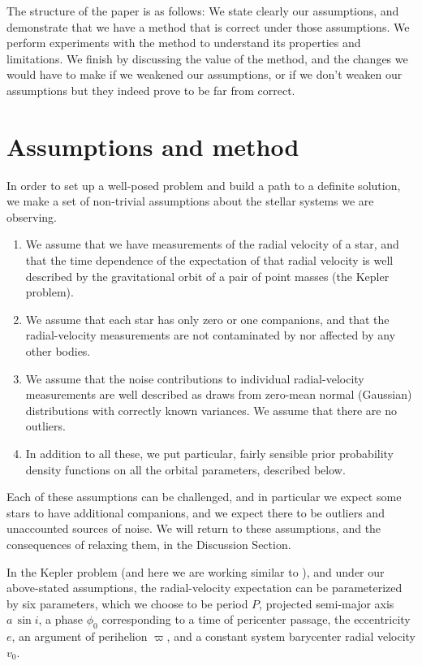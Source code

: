 \documentclass[12pt, preprint]{aastex}
\newcommand{\asini}{a\,\sin i}
\begin{document}
The structure of the paper is as follows:
We state clearly our assumptions, and demonstrate that we have a
method that is correct under those assumptions.
We perform experiments with the method to understand its properties
and limitations.
We finish by discussing the value of the method, and the changes we
would have to make if we weakened our assumptions, or if we don't
weaken our assumptions but they indeed prove to be far from correct.

\section{Assumptions and method}

In order to set up a well-posed problem and build a path to a
definite solution, we make a set of non-trivial assumptions about the
stellar systems we are observing.
\begin{enumerate}
\item We assume that we have measurements of the radial velocity of a
  star, and that the time dependence of the expectation of that radial
  velocity is well described by the gravitational orbit of a pair of
  point masses (the Kepler problem).
\item We assume that each star has only zero or one companions, and
  that the radial-velocity measurements are not contaminated by nor
  affected by any other bodies.
\item We assume that the noise contributions to individual
  radial-velocity measurements are well described as draws from
  zero-mean normal (Gaussian) distributions with correctly known
  variances. We assume that there are no outliers.
\item In addition to all these, we put particular, fairly sensible
  prior probability density functions on all the orbital parameters,
  described below.
\end{enumerate}
Each of these assumptions can be challenged, and in particular we
expect some stars to have additional companions, and we expect there
to be outliers and unaccounted sources of noise.
We will return to these assumptions, and the consequences of relaxing
them, in the Discussion Section.

In the Kepler problem (and here we are working similar to
\citealt{winn}), and under our above-stated assumptions, the
radial-velocity expectation can be parameterized by six parameters,
which we choose to be period $P$, projected semi-major axis $\asini$,
a phase $\phi_0$ corresponding to a time of pericenter passage, the
eccentricity $e$, an argument of perihelion $\varpi$, and a constant 
system barycenter radial velocity $v_0$.
\end{document}
